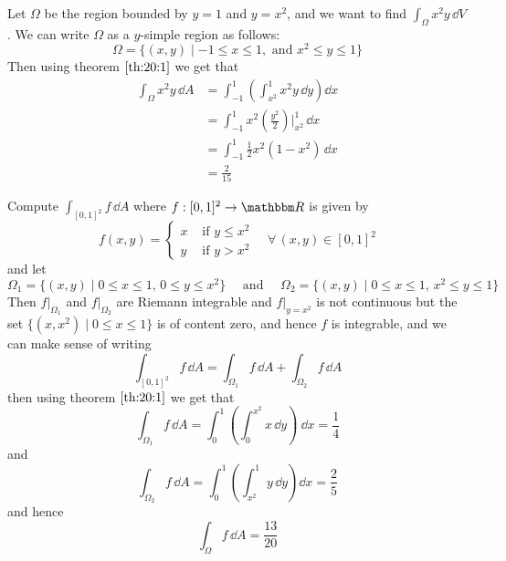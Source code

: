 \documentclass[../Analysis-3]{subfiles}
\begin{document}
\begin{Eg}{}{}
    Let $\Omega$ be the region bounded by $y = 1$ and $y = x^2$, and we want to find $\int_{\Omega} x^2y \, \dd V$. We can write $\Omega$ as a $y$-simple region as follows:
    \[
        \Omega = \{ (x,y) \mid -1 \leq x \leq 1, \mbox{ and } x^2 \leq y \leq 1 \}
    \]
    Then using theorem $\ref{th:20:1}$ we get that
    \begin{align*}
        \int_{\Omega} x^2y \, \dd A & = \int_{-1}^1 \left( \int_{x^2}^1 x^2y \, \dd y\right)\dd x               \\
                                    & = \int_{-1}^1 x^2 \left( \frac{y^2}{2} \right)\bigg\vert_{x^2}^1 \, \dd x \\
                                    & = \int_{-1}^1 \frac{1}{2} x^2(1-x^2) \, \dd x                             \\
                                    & = \frac{2}{15}
    \end{align*}
\end{Eg}

\begin{Eg}{}{}
    Compute $\int_{[0,1]^2} f \, \dd A$ where $f : [0,1]^2 \to \R$ is given by
    \[
        f(x,y) = \begin{cases}
            x & \mbox{ if } y \leq x^2 \\ y & \mbox{ if } y > x^2
        \end{cases} \quad \forall \, (x,y) \in [0,1]^2
    \]
    and let
    \[
        \Omega_1 = \{ (x,y) \mid 0 \leq x \leq 1, \, 0 \leq y \leq x^2 \} \quad \mbox{ and } \quad \Omega_2 = \{ (x,y) \mid 0 \leq x \leq 1, \, x^2 \leq y \leq 1 \}
    \]
    Then $f\vert_{\Omega_1}$ and $f\vert_{\Omega_2}$ are Riemann integrable and $f\vert_{y=x^2}$ is not continuous but the set $\{ (x,x^2) \mid 0 \leq x \leq 1 \}$ is of content zero, and hence $f$ is integrable, and we can make sense of writing
    \[
        \int_{[0,1]^2} f \, \dd A = \int_{\Omega_1} f \, \dd A + \int_{\Omega_2} f \, \dd A
    \]
    then using theorem $\ref{th:20:1}$ we get that
    \[
        \int_{\Omega_1} f \, \dd A = \int_0^1 \left( \int_0^{x^2} x \, \dd y \right)\ \dd x = \frac{1}{4}
    \]
    and
    \[
        \int_{\Omega_2} f \, \dd A = \int_0^1 \left( \int_{x^2}^1 y \, \dd y\right)\dd x = \frac{2}{5}
    \]
    and hence
    \[
        \int_{\Omega} f \, \dd A = \frac{13}{20}
    \]
\end{Eg}
\end{document}
